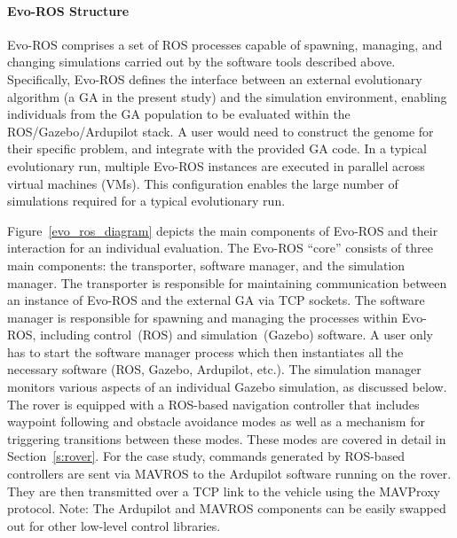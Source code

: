 \paragraph{Evo-ROS Structure}
Evo-ROS
comprises a set of ROS processes capable of spawning, managing, and changing simulations
carried out by the software tools described above.
%
Specifically, Evo-ROS defines the 
interface between an external evolutionary algorithm (a GA in the present study) and the simulation environment,
enabling individuals from the GA population to be evaluated within the ROS/Gazebo/Ardupilot
stack. 
%
A user would need to construct the genome for their specific problem, and integrate with the provided GA code.  
%
In a typical evolutionary run, multiple Evo-ROS instances are executed
in parallel across virtual machines (VMs).
% 
This configuration 
enables the large number of simulations required for a typical evolutionary run.

Figure~\ref{evo_ros_diagram} depicts the main components of Evo-ROS and their interaction
for an individual evaluation.
%
The Evo-ROS ``core'' consists of three main components: 
the transporter, software manager, and the simulation manager. 
%
The transporter is responsible for maintaining communication between an instance of Evo-ROS and the external GA via TCP sockets. 
%
The software manager is responsible for spawning and managing the processes within Evo-ROS, including control~(ROS) and simulation~(Gazebo) software. 
%
A user only has to start the software manager process which then instantiates
all the necessary software (ROS, Gazebo, Ardupilot, etc.).
% 
%
The simulation manager monitors various aspects of 
an individual Gazebo simulation, as discussed below.  
%
%
The rover is equipped with a ROS-based navigation controller that includes waypoint following and obstacle avoidance modes as well as a mechanism for triggering transitions between these modes.
%
These modes are covered in detail in Section~\ref{s:rover}.
%
For the case study, commands generated by ROS-based controllers are sent via MAVROS to the Ardupilot software running on the rover.  
%
They are then transmitted over a TCP link to the vehicle using the MAVProxy protocol. 
%
Note: The Ardupilot and MAVROS components can be easily swapped out for other low-level control libraries.
%

